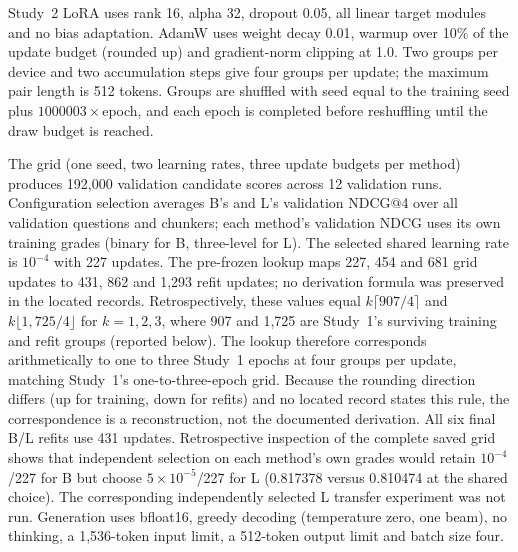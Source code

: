 Study~2 LoRA uses rank 16, alpha 32, dropout 0.05, all linear target modules and no bias adaptation. AdamW uses weight decay 0.01, warmup over 10\% of the update budget (rounded up) and gradient-norm clipping at 1.0. Two groups per device and two accumulation steps give four groups per update; the maximum pair length is 512 tokens. Groups are shuffled with seed equal to the training seed plus $1000003\times$epoch, and each epoch is completed before reshuffling until the draw budget is reached.

The grid (one seed, two learning rates, three update budgets per method) produces 192,000 validation candidate scores across 12 validation runs. Configuration selection averages B's and L's validation NDCG@4 over all validation questions and chunkers; each method's validation NDCG uses its own training grades (binary for B, three-level for L). The selected shared learning rate is $10^{-4}$ with 227 updates. The pre-frozen lookup maps 227, 454 and 681 grid updates to 431, 862 and 1,293 refit updates; no derivation formula was preserved in the located records. Retrospectively, these values equal $k\lceil 907/4\rceil$ and $k\lfloor 1{,}725/4\rfloor$ for $k=1,2,3$, where 907 and 1,725 are Study~1's surviving training and refit groups (reported below). The lookup therefore corresponds arithmetically to one to three Study~1 epochs at four groups per update, matching Study~1's one-to-three-epoch grid. Because the rounding direction differs (up for training, down for refits) and no located record states this rule, the correspondence is a reconstruction, not the documented derivation. All six final B/L refits use 431 updates. Retrospective inspection of the complete saved grid shows that independent selection on each method's own grades would retain $10^{-4}$/227 for B but choose $5\times10^{-5}$/227 for L (0.817378 versus 0.810474 at the shared choice). The corresponding independently selected L transfer experiment was not run. Generation uses bfloat16, greedy decoding (temperature zero, one beam), no thinking, a 1,536-token input limit, a 512-token output limit and batch size four.

